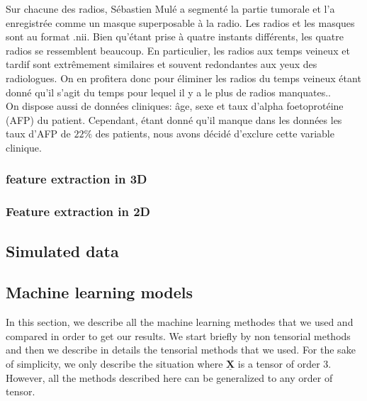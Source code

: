 \documentclass[10pt]{article}
\begin{document}
Sur chacune des radios, Sébastien Mulé a segmenté la partie tumorale et l'a enregistrée comme un masque superposable à la radio. Les radios et les masques sont au format .nii. Bien qu'étant prise à quatre instants différents, les quatre radios se ressemblent beaucoup. En particulier, les radios aux temps veineux et tardif sont extrêmement similaires et souvent redondantes aux yeux des radiologues. On en profitera donc pour éliminer les radios du temps veineux étant donné qu'il s'agit du temps pour lequel il y a le plus de radios manquates..\\
\indent On dispose aussi de données cliniques: âge, sexe et taux d'alpha foetoprotéine (AFP) du patient. Cependant, étant donné qu'il manque dans les données les taux d'AFP de $22\%$ des patients, nous avons décidé d'exclure cette variable clinique.\\

\subsubsection{feature extraction in 3D}

\subsubsection{Feature extraction in 2D}

\subsection{Simulated data}

\subsection{Machine learning models}

In this section, we describe all the machine learning methodes that we used and compared in order to get our results. We start briefly by non tensorial methods and then we describe in details the tensorial methods that we used. For the sake of simplicity, we only describe the situation where $\underline{\mathbf{X}}$ is a tensor of order 3. However, all the methods described here can be generalized to any order of tensor.
\end{document}
